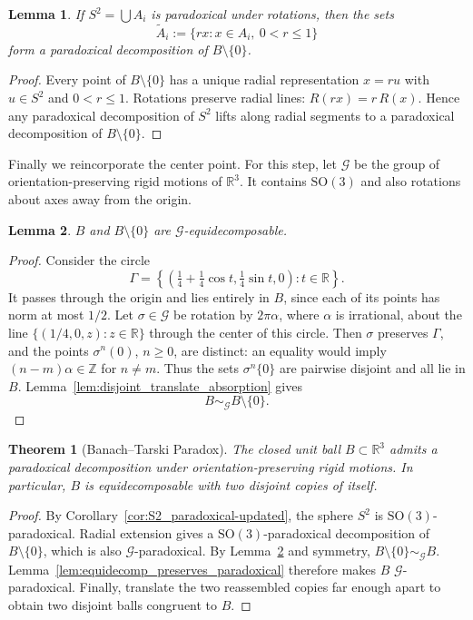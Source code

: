 \documentclass[12pt,a4paper]{article}
\theoremstyle{spaced}
\newtheorem{theorem}{Theorem}[section]
\newtheorem{lemma}{Lemma}[section]
\begin{document}
\begin{lemma}
	If \(S^2 = \bigcup A_i\) is paradoxical under rotations, then the sets
	\[
		\widetilde{A}_i := \{ r x : x\in A_i,\ 0<r\le 1 \}
	\]
	form a paradoxical decomposition of \(B\setminus\{0\}\).
\end{lemma}

\begin{proof}
	Every point of \(B\setminus\{0\}\) has a unique radial representation
	\(x = r u\) with \(u\in S^2\) and \(0<r\le1\).
	Rotations preserve radial lines:
	\(
	R(rx) = r\,R(x).
	\)
	Hence any paradoxical decomposition of \(S^2\) lifts along radial segments
	to a paradoxical decomposition of \(B\setminus\{0\}\).
\end{proof}

Finally we reincorporate the center point. For this step, let $\mathcal G$
be the group of orientation-preserving rigid motions of $\mathbb{R}^3$.
It contains $\mathrm{SO}(3)$ and also rotations about axes away from the origin.

\begin{lemma}\label{lem:ball_center_equidecomp-updated}
	\(B\) and \(B\setminus\{0\}\) are $\mathcal G$-equidecomposable.
\end{lemma}

\begin{proof}
	Consider the circle
	\[
		\Gamma=\left\{\left(\tfrac14+\tfrac14\cos t,
		\tfrac14\sin t,0\right):t\in\mathbb R\right\}.
	\]
	It passes through the origin and lies entirely in $B$, since each of its
	points has norm at most $1/2$. Let $\sigma\in\mathcal G$ be rotation
	by $2\pi\alpha$, where $\alpha$ is irrational, about the line
	$\{(1/4,0,z):z\in\mathbb R\}$ through the center of this circle.
	Then $\sigma$ preserves $\Gamma$, and the points $\sigma^n(0)$, $n\ge0$,
	are distinct: an equality would imply $(n-m)\alpha\in\mathbb Z$ for $n\ne m$.
	Thus the sets $\sigma^n\{0\}$ are pairwise disjoint and all lie in $B$.
	Lemma~\ref{lem:disjoint_translate_absorption} gives
	\[
		B\sim_{\mathcal G}B\setminus\{0\}.
	\]
\end{proof}

\begin{theorem}[Banach--Tarski Paradox]\label{thm:bt}
	The closed unit ball \(B\subset\mathbb{R}^3\) admits a paradoxical
	decomposition under orientation-preserving rigid motions.
	In particular, \(B\) is equidecomposable with two disjoint copies of itself.
\end{theorem}

\begin{proof}
	By Corollary~\ref{cor:S2_paradoxical-updated}, the sphere \(S^2\) is
	$\mathrm{SO}(3)$-paradoxical. Radial extension gives a
	$\mathrm{SO}(3)$-paradoxical decomposition of \(B\setminus\{0\}\),
	which is also $\mathcal G$-paradoxical.
	By Lemma~\ref{lem:ball_center_equidecomp-updated} and symmetry,
	$B\setminus\{0\}\sim_{\mathcal G}B$.
	Lemma~\ref{lem:equidecomp_preserves_paradoxical} therefore makes $B$
	$\mathcal G$-paradoxical. Finally, translate the two reassembled copies
	far enough apart to obtain two disjoint balls congruent to $B$.
\end{proof}


\newpage



\end{document}
